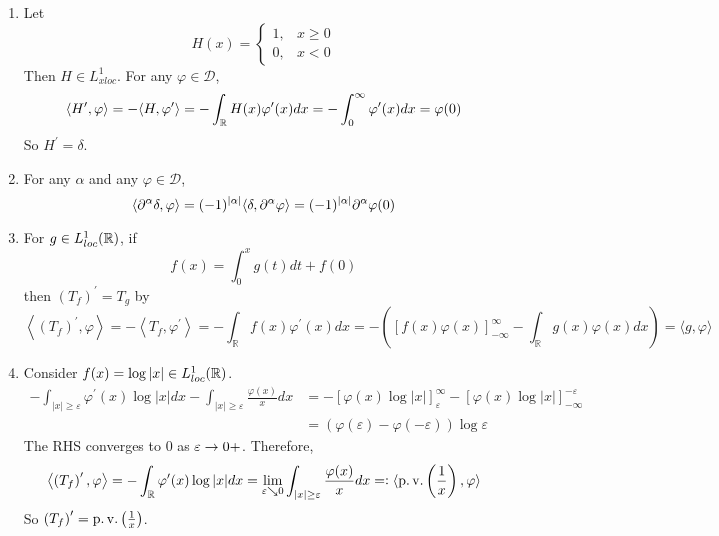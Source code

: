 \begin{enumerate}[label=\arabic*.]
	\begin{exam}
		\begin{enumerate}[label=(\arabic{*})]
			\item Let
			\begin{equation*}
				H(x)= 
				\begin{cases}
					1, & x \geq 0 \\ 
					0, & x<0 
				\end{cases}
			\end{equation*}
			Then $H \in L^1_{xloc}$. For any $\varphi \in \mathcal{D}$,
			\begin{equation*}
				\langle H^\prime, \varphi \rangle = -\langle H,\varphi^\prime \rangle = -\int_{\mathbb{R}} H(x) \varphi^\prime(x)dx = -\int_0^\infty \varphi^\prime(x)dx = \varphi(0)
			\end{equation*}
			So $H^\prime = \delta$.

			\item For any $\alpha$ and any $\varphi \in \mathcal{D}$,
			\begin{equation*}
				\langle \partial^\alpha \delta, \varphi \rangle = (-1)^{\left\lvert\alpha\right\lvert}\langle \delta, \partial^\alpha \varphi \rangle = (-1)^{\left\lvert\alpha\right\lvert} \partial^\alpha \varphi(0)
			\end{equation*}

			\item For $g \in L^1_{loc}(\mathbb{R})$, if
			\begin{equation*}
				f(x) = \int_0^x g(t)dt+f(0)
			\end{equation*}
			then $(T_f)^\prime = T_g$ by
			\begin{equation*}
				\left\langle\left(T_f\right)^{\prime}, \varphi\right\rangle=-\left\langle T_f, \varphi^{\prime}\right\rangle=-\int_{\mathbb{R}} f(x) \varphi^{\prime}(x) d x=-\left([f(x) \varphi(x)]_{-\infty}^{\infty}-\int_{\mathbb{R}} g(x) \varphi(x) d x\right)=\langle g, \varphi\rangle
			\end{equation*}

			\item Consider $f(x) = \log \left\lvert x\right\lvert \in L^1_{loc}(\mathbb{R})$.
			\begin{equation*}
				\begin{aligned}
					-\int_{|x| \geq \varepsilon} \varphi^{\prime}(x) \log |x| d x-\int_{|x| \geq \varepsilon} \frac{\varphi(x)}{x} d x &= -[\varphi(x) \log |x|]_{\varepsilon}^{\infty}-[\varphi(x) \log |x|]_{-\infty}^{-\varepsilon} \\
					&=(\varphi(\varepsilon)-\varphi(-\varepsilon)) \log \varepsilon
				\end{aligned}
			\end{equation*}
			The RHS converges to $0$ as $\varepsilon \rightarrow 0+$. Therefore,
			\begin{equation*}
				\left\langle\left(T_f\right)^{\prime}, \varphi\right\rangle=-\int_{\mathbb{R}} \varphi^{\prime}(x) \log |x| d x=\lim _{\varepsilon \searrow 0} \int_{|x| \geq \varepsilon} \frac{\varphi(x)}{x} d x =\vcentcolon \langle \operatorname{p.v.}\left(\frac{1}{x}\right),\varphi \rangle
			\end{equation*}
			So $\left(T_f\right)^{\prime} = \operatorname{p.v.}\left(\frac{1}{x}\right)$.
		\end{enumerate}
	\end{exam}


\end{enumerate}
